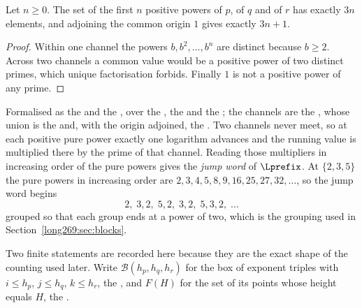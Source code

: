 \begin{proposition}\label{long269:res:count}
Let $n\ge0$.  The set of the first $n$ positive powers of $p$, of $q$ and of
$r$ has exactly $3n$ elements, and adjoining the common origin $1$ gives
exactly $3n+1$.
\end{proposition}

\begin{proof}
Within one channel the powers $b,b^{2},\ldots,b^{n}$ are distinct because
$b\ge2$.  Across two channels a common value would be a positive power of two
distinct primes, which unique factorisation forbids.  Finally $1$ is not a
positive power of any prime.
\end{proof}

\noindent Formalised as the
 and the
, over the
, the
 and the
; the channels are the
, whose union is the
 and, with the origin adjoined, the
.  Two channels never meet, so at each positive pure power exactly
one logarithm advances and the running value is multiplied there by the prime
of that channel.  Reading those multipliers in increasing order of the pure
powers gives the \emph{jump word} of $\Lprefix$.  At $\{2,3,5\}$ the pure
powers in increasing order are $2,3,4,5,8,9,16,25,27,32,\ldots$, so the jump
word begins
\[
 2,\;3,2,\;5,2,\;3,2,\;5,3,2,\;\ldots
\]
grouped so that each group ends at a power of two, which is the grouping used
in Section~\ref{long269:sec:blocks}.

Two finite statements are recorded here because they are the exact shape of the
counting used later.  Write $\mathcal B(h_p,h_q,h_r)$ for the box of exponent
triples with $i\le h_p$, $j\le h_q$, $k\le h_r$, the
, and $F(H)$ for the set of its points whose height equals $H$, the
.

